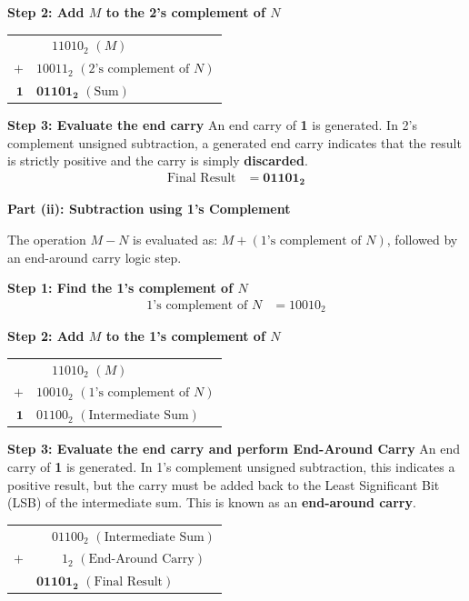 \documentclass[12pt,a3paper]{article}
\begin{document}
\begin{enumerate}
\begin{tcolorbox}[enhanced,breakable,ansbox,colback=cD!4,colframe=cD,boxrule=0.8pt,arc=5pt,title={\textbf{Answer}},fonttitle=\bfseries\color{white},colbacktitle=cD]
\textbf{Step 2: Add $M$ to the 2's complement of $N$}
\begin{center}
\renewcommand{\arraystretch}{1.2}
\begin{tabular}{r@{\quad}l}
      & $\phantom{+}11010_2$ \quad $(M)$ \\
  $+$ & $10011_2$ \quad $(\text{2's complement of } N)$ \\
  \midrule
  $\mathbf{1}$ & $\mathbf{01101_2}$ \quad $(\text{Sum})$
\end{tabular}
\end{center}

\textbf{Step 3: Evaluate the end carry}
An end carry of \textbf{1} is generated. In 2's complement unsigned subtraction, a generated end carry indicates that the result is strictly positive and the carry is simply \textbf{discarded}.
\begin{align*}
    \text{Final Result} &= \mathbf{01101_2}
\end{align*}

\vspace{1em}
\textbf{\textcolor{cD}{Part (ii): Subtraction using 1's Complement}}

The operation $M - N$ is evaluated as: $M + (\text{1's complement of } N)$, followed by an end-around carry logic step.

\textbf{Step 1: Find the 1's complement of $N$}
\begin{align*}
    \text{1's complement of } N &= 10010_2
\end{align*}

\textbf{Step 2: Add $M$ to the 1's complement of $N$}
\begin{center}
\renewcommand{\arraystretch}{1.2}
\begin{tabular}{r@{\quad}l}
      & $\phantom{+}11010_2$ \quad $(M)$ \\
  $+$ & $10010_2$ \quad $(\text{1's complement of } N)$ \\
  \midrule
  $\mathbf{1}$ & $01100_2$ \quad $(\text{Intermediate Sum})$
\end{tabular}
\end{center}

\textbf{Step 3: Evaluate the end carry and perform End-Around Carry}
An end carry of \textbf{1} is generated. In 1's complement unsigned subtraction, this indicates a positive result, but the carry must be added back to the Least Significant Bit (LSB) of the intermediate sum. This is known as an \textbf{end-around carry}.
\begin{center}
\renewcommand{\arraystretch}{1.2}
\begin{tabular}{r@{\quad}l}
      & $\phantom{+}01100_2$ \quad $(\text{Intermediate Sum})$ \\
  $+$ & $\phantom{0000}1_2$ \quad $(\text{End-Around Carry})$ \\
  \midrule
      & $\mathbf{01101_2}$ \quad $(\text{Final Result})$
\end{tabular}
\end{center}


\end{tcolorbox}
\end{enumerate}
\end{document}
